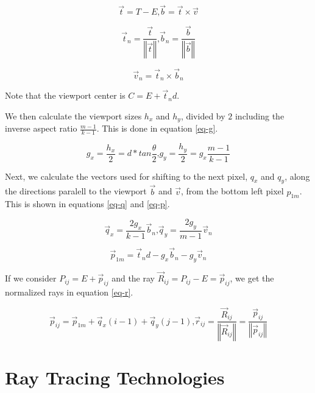 \begin{equation}
  \overrightarrow{t} = T - E
  \text{,}
  \overrightarrow{b} = \overrightarrow{t} \times \overrightarrow{v}
  \label{eq-t-b}
\end{equation}

\begin{equation}
  \overrightarrow{t}_{n} = \frac{\overrightarrow{t}}{\left\Vert \overrightarrow{t} \right\Vert}
  \text{,}
  \overrightarrow{b}_{n} = \frac{\overrightarrow{b}}{\left\Vert \overrightarrow{b} \right\Vert}
  \label{eq-tn-bn}
\end{equation}

\begin{equation}
  \overrightarrow{v}_{n} = \overrightarrow{t}_{n} \times \overrightarrow{b}_{n}
  \label{eq-vn}
\end{equation}

Note that the viewport center is $C = E + \overrightarrow{t}_{n}d$.

We then calculate the viewport sizes $h_x$ and $h_y$, divided by $2$ including the inverse aspect ratio $\frac{m-1}{k-1}$. This is done in equation \ref{eq-g}.

\begin{equation}
  g_x = \frac{h_x}{2} = d * tan \frac{\theta}{2}
  \text{,}
  g_y = \frac{h_y}{2} = g_x \frac{m-1}{k-1}
  \label{eq-g}
\end{equation}

Next, we calculate the vectors used for shifting to the next pixel, $q_x$ and $q_y$, along the directions paralell to the viewport $\overrightarrow{b}$ and $\overrightarrow{v}$, from the bottom left pixel $p_{1m}$. This is shown in equations \ref{eq-q} and \ref{eq-p}.

\begin{equation}
  \overrightarrow{q}_x = \frac{2g_x}{k-1} \overrightarrow{b}_n
  \text{,}
  \overrightarrow{q}_y = \frac{2g_y}{m-1} \overrightarrow{v}_n
  \label{eq-q}
\end{equation}

\begin{equation}
  \overrightarrow{p}_{1m} = \overrightarrow{t}_n d - g_x \overrightarrow{b}_n - g_y \overrightarrow{v}_n
  \label{eq-p}
\end{equation}

If we consider $P_{ij} = E + \overrightarrow{p}_{ij}$ and the ray $\overrightarrow{R}_{ij} = P_{ij} - E = \overrightarrow{p}_{ij}$, we get the normalized rays in equation \ref{eq-r}.

\begin{equation}
  \overrightarrow{p}_{ij} = \overrightarrow{p}_{1m} + \overrightarrow{q}_x(i - 1) + \overrightarrow{q}_y(j - 1)
  \text{,}
  \overrightarrow{r}_{ij} = \frac{\overrightarrow{R}_{ij}}{\left\Vert \overrightarrow{R}_{ij} \right\Vert} = \frac{\overrightarrow{p}_{ij}}{\left\Vert \overrightarrow{p}_{ij} \right\Vert}
  \label{eq-r}
\end{equation}

\section{Ray Tracing Technologies}
